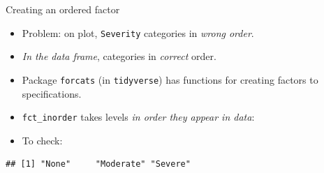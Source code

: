 \documentclass[ignorenonframetext,]{beamer}
\newenvironment{Shaded}{\begin{snugshade}}{\end{snugshade}}
\newcommand{\DataTypeTok}[1]{\textcolor[rgb]{0.13,0.29,0.53}{#1}}
\newcommand{\KeywordTok}[1]{\textcolor[rgb]{0.13,0.29,0.53}{\textbf{#1}}}
\newcommand{\NormalTok}[1]{#1}
\newcommand{\OperatorTok}[1]{\textcolor[rgb]{0.81,0.36,0.00}{\textbf{#1}}}
\newcommand{\StringTok}[1]{\textcolor[rgb]{0.31,0.60,0.02}{#1}}
\providecommand{\tightlist}{%
  \setlength{\itemsep}{0pt}\setlength{\parskip}{0pt}}
\begin{document}
\begin{frame}[fragile]{Creating an ordered factor}
\protect\hypertarget{creating-an-ordered-factor}{}

\begin{itemize}
\item
  Problem: on plot, \texttt{Severity} categories in \emph{wrong
  order}.
\item
  \emph{In the data frame}, categories in \emph{correct} order.
\item
  Package \texttt{forcats} (in \texttt{tidyverse}) has functions for
  creating factors to specifications.
\item
  \texttt{fct\_inorder} takes levels \emph{in order they appear in
  data}:
\end{itemize}

\begin{Shaded}
\end{Shaded}

\begin{itemize}
\tightlist
\item
  To check:
\end{itemize}

\begin{Shaded}
\end{Shaded}

\begin{verbatim}
## [1] "None"     "Moderate" "Severe"
\end{verbatim}

\end{frame}
\end{document}

